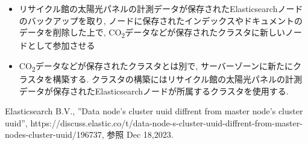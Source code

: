 \documentclass[a4j,12pt,]{jarticle}
\begin{document}
\begin{itemize}
  \item リサイクル館の太陽光パネルの計測データが保存されたElasticsearchノードのバックアップを取り, ノードに保存されたインデックスやドキュメントのデータを削除した上で, CO\textsubscript{2}データなどが保存されたクラスタに新しいノードとして参加させる
  \item CO\textsubscript{2}データなどが保存されたクラスタとは別で, サーバーゾーンに新たにクラスタを構築する. クラスタの構築にはリサイクル館の太陽光パネルの計測データが保存されたElasticsearchノードが所属するクラスタを使用する.
\end{itemize}

\begin{thebibliography}{5}
  Elasticsearch B.V., ”Data node's cluster uuid diffrent from master node's cluster uuid”, https://discuss.elastic.co/t/data-node-s-cluster-uuid-diffrent-from-master-nodes-cluster-uuid/196737, 参照 Dec 18,2023.
\end{thebibliography}
\end{document}
